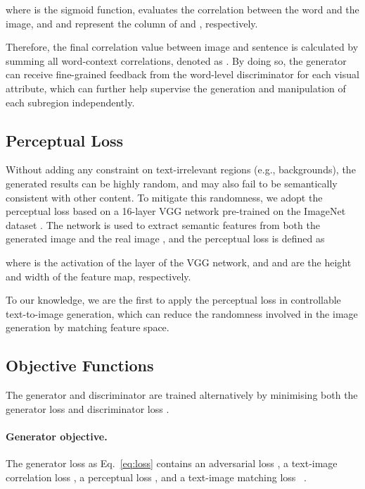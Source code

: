 \documentclass{article}
\begin{document}
where  is the sigmoid function,  evaluates the correlation between the  word and the image, and  and  represent the  column of  and , respectively.

Therefore, the final correlation value  between image  and sentence  is calculated by summing all word-context correlations, denoted as .
By doing so, the generator can receive fine-grained feedback from the word-level discriminator for each visual attribute, which can further help supervise the generation and manipulation of each subregion independently.

\subsection{Perceptual Loss}
\label{sec:semantic}
Without {adding} any constraint on text-irrelevant regions (e.g., backgrounds), the generated results can be highly random, and may also fail to be semantically consistent with other content. 
To mitigate this randomness, we adopt the perceptual loss \cite{johnson2016perceptual} based on a 16-layer VGG network \cite{simonyan2014very} pre-trained on the ImageNet dataset \cite{russakovsky2015imagenet}. 
The network is used to extract semantic features from both the generated image  and the real image , and the  perceptual loss is defined as

where  is the activation of the  layer of the VGG network, and  and  are the height and width of the feature map, respectively.

To our knowledge, we are the first to apply the perceptual loss \cite{johnson2016perceptual} in controllable text-to-image generation, {which can} reduce the randomness involved in the image generation by matching feature space. 


\subsection{Objective Functions}
\label{obj}
The generator and discriminator are trained alternatively by minimising both the generator loss  and discriminator loss .

\paragraph{Generator objective.} 
The generator loss  as Eq.~\eqref{eq:loss} contains an adversarial loss , a text-image correlation loss , a perceptual loss , and a text-image matching loss ~\cite{xu2018attngan}.  
\end{document}
